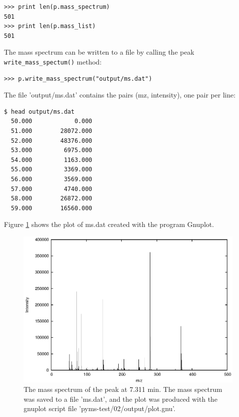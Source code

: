 \begin{verbatim}
>>> print len(p.mass_spectrum)
501
>>> print len(p.mass_list)
501
\end{verbatim}

The mass spectrum can be written to a file by calling the peak
{\tt write\_mass\_spectum()} method:

\begin{verbatim}
>>> p.write_mass_spectrum("output/ms.dat")
\end{verbatim}

\noindent
The file 'output/ms.dat' contains the pairs (mz, intensity), one pair
per line:

\begin{verbatim}
$ head output/ms.dat
  50.000            0.000
  51.000        28072.000
  52.000        48376.000
  53.000         6975.000
  54.000         1163.000
  55.000         3369.000
  56.000         3569.000
  57.000         4740.000
  58.000        26872.000
  59.000        16560.000
\end{verbatim}

Figure \ref{fig:mass-spectrum} shows the plot of ms.dat created with the
program Gnuplot.

\begin{figure}[htp]
\begin{center}
\includegraphics{graphics/pyms-test/ms.eps}
\caption{The mass spectrum of the peak at 7.311 min. The mass spectrum was
saved to a file 'ms.dat', and the plot was produced with the gnuplot script
file 'pyms-test/02/output/plot.gnu'.}
\label{fig:mass-spectrum}
\end{center}
\end{figure}

